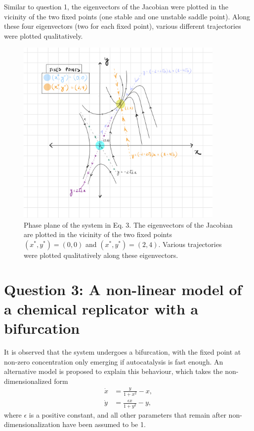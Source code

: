 \documentclass[12pt]{article}
\begin{document}
Similar to question 1, the eigenvectors of the Jacobian were plotted in the
vicinity of the two fixed points (one stable and one unstable saddle point).
Along these four eigenvectors (two for each fixed point), various different
trajectories were plotted qualitatively.
\begin{figure}[htbp]
    \centering
    \includegraphics[width=0.9\textwidth]{figures/q2_sketch.jpeg}
    \caption{\centering Phase plane of the system in Eq. 3. The eigenvectors of the Jacobian are plotted in the vicinity of the two fixed points $(x^*,y^*) = (0,0)$ and $(x^*,y^*) = (2,4)$. Various trajectories were plotted qualitatively along these eigenvectors.}
\end{figure}

\newpage
\section*{Question 3: A non-linear model of a chemical replicator with a bifurcation}
It is observed that the system undergoes a bifurcation, with the fixed point at non-zero concentration only
emerging if autocatalysis is fast enough. An alternative model is proposed to explain this behaviour, which
takes the non-dimensionalized form
\begin{align}
    \dot{x} & = \frac{y}{1 + x^2} - x, \nonumber             \\[2pt]
    \dot{y} & = \frac{\epsilon x}{1 + y^2} - y, \label{eq:5}
\end{align}
where $\epsilon$ is a positive constant, and all other parameters that remain after non-dimensionalization have been
assumed to be 1.
\end{document}
